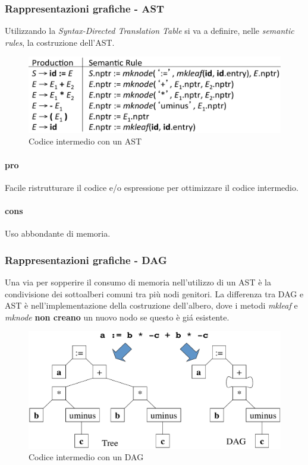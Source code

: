 \subsubsection{Rappresentazioni grafiche - AST}
Utilizzando la \textit{Syntax-Directed Translation Table} si va a definire,
nelle \textit{semantic rules}, la costruzione dell'AST.

\begin{figure}[H]
  \centering
  \includegraphics[scale=0.4]{res/image/ast_rappresentation}
  \caption{Codice intermedio con un AST}
  \label{img:ast_rappresentation}
\end{figure}

\paragraph{pro}
Facile ristrutturare il codice e/o espressione per ottimizzare il codice
intermedio.
\paragraph{cons}
Uso abbondante di memoria.

\subsubsection{Rappresentazioni grafiche - DAG}
Una via per sopperire il consumo di memoria nell'utilizzo di un AST \`e la
condivisione dei sottoalberi comuni tra pi\`u nodi genitori. La differenza tra
DAG e AST \`e nell'implementazione della costruzione dell'albero, dove i
metodi \textit{mkleaf} e \textit{mknode} \textbf{non creano} un nuovo nodo se
questo \`e gi\'a esistente.

\begin{figure}[H]
  \centering
  \includegraphics[scale=0.4]{res/image/dag_rappresentation}
  \caption{Codice intermedio con un DAG}
  \label{img:dag_rappresentation}
\end{figure}


